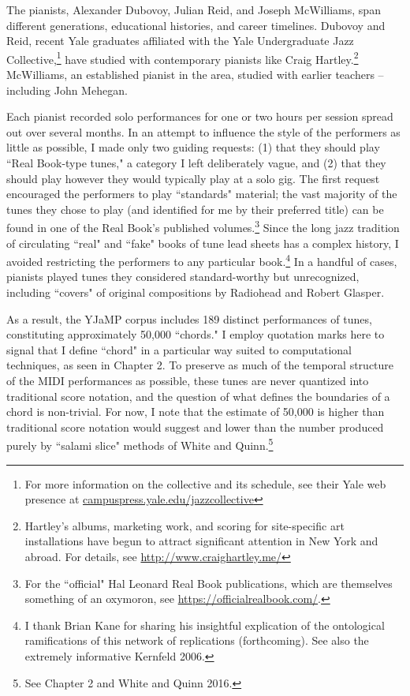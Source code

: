 The pianists, Alexander Dubovoy, Julian Reid, and Joseph McWilliams, span different generations, educational histories, and career timelines.  Dubovoy and Reid, recent Yale graduates affiliated with the Yale Undergraduate Jazz Collective,\footnote{For more information on the collective and its schedule, see their Yale web presence at \href{http://campuspress.yale.edu/jazzcollective/}{campuspress.yale.edu/jazzcollective}} have studied with contemporary pianists like Craig Hartley.\footnote{Hartley's albums, marketing work, and scoring for site-specific art installations have begun to attract significant attention in New York and abroad.  For details, see \href{http://www.craighartley.me/}{http://www.craighartley.me/}}  McWilliams, an established pianist in the area, studied with earlier teachers -- including John Mehegan.

Each pianist recorded solo performances for one or two hours per session spread out over several months.  In an attempt to influence the style of the performers as little as possible, I made only two guiding requests: (1) that they should play ``Real Book-type tunes," a category I left deliberately vague, and (2) that they should play however they would typically play at a solo gig.  The first request encouraged the performers to play ``standards" material; the vast majority of the tunes they chose to play (and identified for me by their preferred title) can be found in one of the Real Book's published volumes.\footnote{For the ``official" Hal Leonard Real Book publications, which are themselves something of an oxymoron, see \href{https://officialrealbook.com/}{https://officialrealbook.com/}.}  Since the long jazz tradition of circulating ``real" and ``fake" books of tune lead sheets has a complex history, I avoided restricting the performers to any particular book.\footnote{I thank Brian Kane for sharing his insightful explication of the ontological ramifications of this network of replications (forthcoming).  See also the extremely informative Kernfeld 2006.}  In a handful of cases, pianists played tunes they considered standard-worthy but unrecognized, including ``covers" of original compositions by Radiohead and Robert Glasper.

As a result, the YJaMP corpus includes 189 distinct performances of tunes, constituting approximately 50,000 ``chords."  I employ quotation marks here to signal that I define ``chord" in a particular way suited to computational techniques, as seen in Chapter 2.  To preserve as much of the temporal structure of the MIDI performances as possible, these tunes are never quantized into traditional score notation, and the question of what defines the boundaries of a chord is non-trivial.  For now, I note that the estimate of 50,000 is higher than traditional score notation would suggest and lower than the number produced purely by ``salami slice" methods of White and Quinn.\footnote{See Chapter 2 and White and Quinn 2016.}

